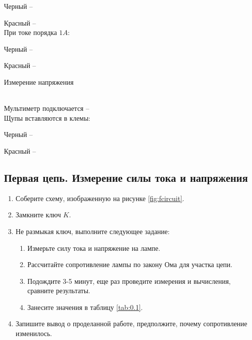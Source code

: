 Черный -- \hrulefill

Красный -- \hrulefill
\\
При токе порядка $1 A$:

Черный -- \hrulefill

Красный -- \hrulefill

Измерение напряжения

\\
Мультиметр подключается -- \hrulefill
\\
Щупы вставляются в клемы:

Черный -- \hrulefill

Красный -- \hrulefill




\subsection{Первая цепь. Измерение силы тока и напряжения}
%
%
\begin{enumerate}
    \item Соберите схему, изображенную на рисунке \ref{fig:fcircuit}.
    \item Замкните ключ $K$.
	\item Не размыкая ключ, выполните следующее задание:
\begin{enumerate}
    \item Измерьте силу тока и напряжение на лампе.
    \item Рассчитайте сопротивление лампы по закону Ома для участка цепи.
	\item Подождите 3-5 минут, еще раз проведите измерения и вычисления, сравните результаты.
	\item Занесите значения в таблицу \ref{tab:0.1}.
	\end{enumerate}
    	 \item Запишите вывод о проделанной работе, предполжите, почему сопротивление изменилось.
\end{enumerate}


